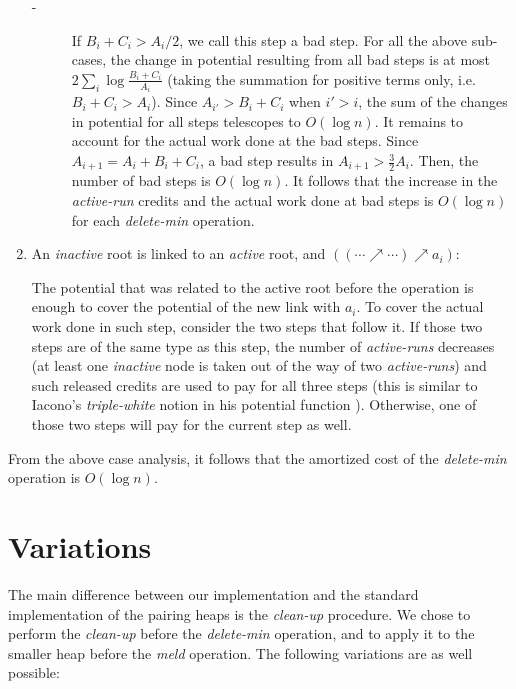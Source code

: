 \begin{enumerate}
\begin{description}
\item[-] If $B_i+C_i > A_i/2$, we call this step a bad step. For all the above sub-cases, the change in potential resulting from all bad steps is at most $2\sum_i \log{\frac{B_i+C_i}{A_i}}$ (taking the summation for positive terms only, i.e. $B_i+C_i > A_i$). Since $A_{i'} > B_i+C_i$ when $i'>i$, the sum of the changes in potential for all steps telescopes to $O(\log{n})$. It remains to account for the actual work done at the bad steps. Since $A_{i+1}=A_i+B_i+C_i$, a bad step results in $A_{i+1} > \frac{3}{2} A_{i}$.  Then, the number of bad steps is $O(\log{n})$. It follows that the increase in the {\it active-run} credits and the actual work done at bad steps is $O(\log n)$ for each {\it delete-min} operation.\\  

\end{description}


\item An {\it inactive} root is linked to an {\it active} root, and $((\cdots \nearrow \cdots) \nearrow a_i)$: 

The potential that was related to the active root before the operation is enough to cover the potential of the new link with $a_i$. 
To cover the actual work done in such step, consider the two steps that follow it. If those two steps are of the same type as this step, the number of {\it active-runs} decreases (at least one {\it inactive} node is taken out of the way of two {\it active-runs}) and such released credits are used to pay for all three steps (this is similar to Iacono's {\it triple-white} notion in his potential function \cite{ia}). Otherwise, one of those two steps will pay for the current step as well. 

\end{enumerate}

From the above case analysis, it follows that the amortized cost of the {\it delete-min} operation is $O(\log{n})$.


\section{Variations}

The main difference between our implementation and the standard implementation of the pairing heaps is the {\it clean-up} procedure. We chose to perform the {\it clean-up} before the {\it delete-min} operation, and to apply it to the smaller heap before the {\it meld} operation. 
The following variations are as well possible:

